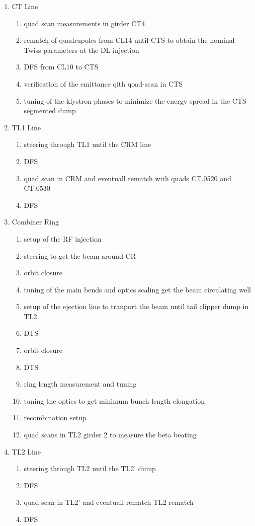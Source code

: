 \begin{enumerate}
\item CT Line
  \begin{enumerate}
    \item quad scan measurements in girder CT4
    \item rematch of quadrupoles from CL14 until CTS to obtain 
          the nominal Twiss parameters at the DL injection
    \item DFS from CL10 to CTS 
    \item verification of the emittance qith qoad-scan in CTS 
    \item tuning of the klystron phases to minimize the energy 
          spread in the CTS segmented dump
  \end{enumerate}


\item TL1 Line
  \begin{enumerate}
    \item steering through TL1 until the CRM line
    \item DFS
    \item quad scan in CRM and eventuall rematch with quads CT.0520 and CT.0530
    \item DFS
  \end{enumerate}

\item Combiner Ring 
  \begin{enumerate}
    \item setup of the RF injection
    \item steering to get the beam around CR
    \item orbit closure
    \item tuning of the main bends and optics scaling get the beam circulating well
    \item setup of the ejection line to tranport the beam until tail clipper dump in TL2
    \item DTS
    \item orbit closure
    \item DTS
    \item ring length measurement and tuning
    \item tuning the optics to get minimum bunch length elongation
    \item recombination setup
    \item quad scans in TL2 girder 2 to measure the beta beating 
  \end{enumerate}

\item TL2 Line
  \begin{enumerate}
    \item steering through TL2 until the TL2' dump
    \item DFS
    \item quad scan in TL2' and eventuall rematch TL2 rematch
    \item DFS
  \end{enumerate}


\end{enumerate}

